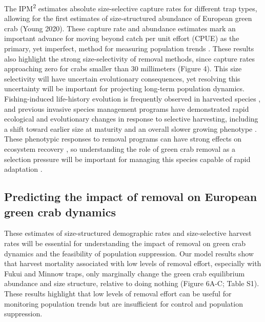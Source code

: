 \documentclass{article}
\begin{document}
The IPM\textsuperscript{2} estimates absolute size-selective capture rates for different trap types, allowing for the first estimates of size-structured abundance of European green crab (Young 2020). These capture rate and abundance estimates mark an important advance for moving beyond catch per unit effort (CPUE) as the primary, yet imperfect, method for measuring population trends \parencite{harley2001catch}. These results also highlight the strong size-selectivity of removal methods, since capture rates approaching zero for crabs smaller than 30 millimeters (Figure 4). This size selectivity will have uncertain evolutionary consequences, yet resolving this uncertainty will be important for projecting long-term population dynamics. Fishing-induced life-history evolution is frequently observed in harvested species \parencite{enberg2012fishing}, and previous invasive species management programs have demonstrated rapid ecological and evolutionary changes in response to selective harvesting, including a shift toward earlier size at maturity and an overall slower growing phenotype \parencite{evangelista2015impacts}. These phenotypic responses to removal programs can have strong effects on ecosystem recovery \parencite{zavorka2020phenotypic}, so understanding the role of green crab removal as a selection pressure will be important for managing this species capable of rapid adaptation \parencite{tepolt2020rapid}.


\subsection{Predicting the impact of removal on European green crab dynamics}

These estimates of size-structured demographic rates and size-selective harvest rates will be essential for understanding the impact of removal on green crab dynamics and the feasibility of population suppression. Our model results show that harvest mortality associated with low levels of removal effort, especially with Fukui and Minnow traps, only marginally change the green crab equilibrium abundance and size structure, relative to doing nothing (Figure 6A-C; Table S1). These results highlight that low levels of removal effort can be useful for monitoring population trends but are insufficient for control and population suppression.
\end{document}

